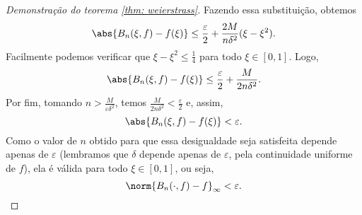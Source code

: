 \begin{proof}[Demonstração do teorema \ref{thm: weierstrass}]
    Fazendo essa substituição, obtemos
    \begin{equation}
        \abs{ B_{ n } (\xi, f) - f(\xi) } \leq
        \frac{ \varepsilon }{ 2 } 
        + \frac{ 2M }{ n \delta^2 } ( \xi - \xi^2 )
    .\end{equation}
    Facilmente podemos verificar que \( \xi - \xi^2 \leq \frac{ 1 }{ 4 } \) para todo \( \xi \in [0, 1] \).
    Logo,
    \begin{equation}
        \abs{ B_{ n } (\xi, f) - f(\xi) } \leq
        \frac{ \varepsilon }{ 2 } 
        + \frac{ M }{ 2 n \delta^2 }
    .\end{equation}
    Por fim, tomando \( n > \frac{ M }{ \varepsilon \delta^2 } \), temos \( \frac{ M }{ 2 n \delta^2 } < \frac{ \varepsilon }{ 2 } \) e, assim,
    \begin{equation}
        \abs{ B_{ n } (\xi, f) - f(\xi) } < \varepsilon
    .\end{equation}
    Como o valor de \( n \) obtido para que essa desigualdade seja satisfeita depende apenas de \( \varepsilon \) (lembramos que \( \delta \) depende apenas de \( \varepsilon \), pela continuidade uniforme de \( f \)), ela é válida para todo \( \xi \in [0, 1] \), ou seja, \[
        \norm{ B_{ n } (\cdot , f) - f }_{ \infty } < \varepsilon
    .\qedhere\]
 \end{proof}
 

